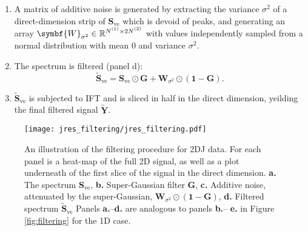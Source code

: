 \begin{enumerate}
    \item A matrix of additive noise is generated by extracting the variance
        $\sigma^2$ of a direct-dimension strip of $\symbf{S}_{\text{ve}}$ which
        is devoid of peaks, and generating an array $\symbf{W}_{\sigma^2} \in
        \mathbb{R}^{\None \times 2 \Ntwo}$ with values independently sampled
        from a normal distribution with mean $0$ and variance  $\sigma^2$.
    \item The spectrum is filtered (panel d):
        \begin{equation}
            \widetilde{\symbf{S}}_{\text{ve}} = \symbf{S}_{\text{ve}} \odot
            \symbf{G} + \symbf{W}_{\sigma^2} \odot (\symbf{1} - \symbf{G}).
        \end{equation}
    \item $\widetilde{\symbf{S}}_{\text{ve}}$ is subjected to \ac{IFT} and is
        sliced in half in the direct dimension, yeilding the final filtered
        signal $\widetilde{\symbf{Y}}$.
\end{enumerate}

\begin{figure}
    \centering
    \texttt{[image: jres\_filtering/jres\_filtering.pdf]}
    \caption[
        An illustration of the filtering procedure for \ac{2DJ} data.
    ]
    {
        An illustration of the filtering procedure for \ac{2DJ} data.
        For each panel is a heat-map of the full \ac{2D} signal, as well as a
        plot underneath of the first slice of the signal in the direct
        dimension.
        \textbf{a.} The spectrum $\symbf{S}_{\text{ve}}$,
        \textbf{b.} Super-Gaussian filter $\symbf{G}$,
        \textbf{c.} Additive noise, attenuated by the super-Gaussian, $\symbf{W}_{\sigma^2} \odot (\symbf{1} - \symbf{G})$,
        \textbf{d.} Filtered spectrum $\widetilde{\symbf{S}}_{\text{ve}}$
        Panels \textbf{a.}--\textbf{d.} are analogous to panels \textbf{b.}--
        \textbf{e.} in Figure \ref{fig:filtering} for the \ac{1D} case.
    }
    \label{fig:jres-filtering}
\end{figure}


